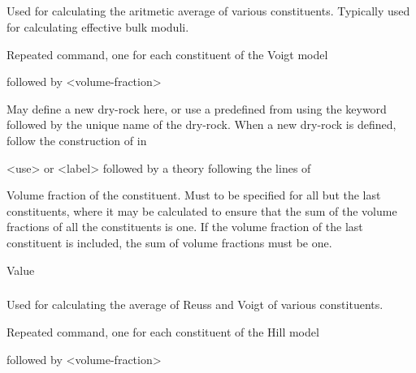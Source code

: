 {\subparagraph{}
 \slist
   \item \Description Used for calculating the aritmetic average of various constituents. Typically used for calculating effective bulk moduli.
   \item \Argument
   \item \Default
 \elist

 \slist
   \item \Description Repeated command, one for each constituent of the Voigt model
   \item {} followed by <volume-fraction>
   \item \Default
 \elist

 \slist
   \item \Description May define a new dry-rock here, or use a predefined  from  using the keyword  followed by the unique name of the dry-rock. When a new dry-rock is defined, follow the construction of  in 
   \item \Argument <use> or <label> followed by a theory following the lines of 
   \item \Default
 \elist

 \slist
   \item \Description Volume fraction of the constituent. Must to be specified for all but the last constituents, where it may be calculated to ensure that the sum of the volume fractions of all the constituents is one. If the volume fraction of the last constituent is included, the sum of volume fractions must be one.
   \item \Argument Value
   \item \Default
 \elist

\subparagraph{}
 \slist
   \item \Description Used for calculating the average of Reuss and Voigt of various constituents.
   \item \Argument
   \item \Default
 \elist

 \slist
   \item \Description Repeated command, one for each constituent of the Hill model
   \item {} followed by <volume-fraction>
   \item \Default
 \elist

}
